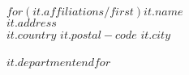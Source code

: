 $for(it.affiliations/first)$$it.name$\\$it.address$\\$it.country$ $it.postal-code$ $it.city$\\\\\textit{$it.department$}$endfor$
